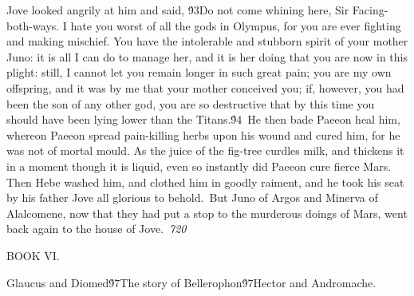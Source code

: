 {Jove looked angrily at him and said, \'93Do not come whining here, Sir Facing-both-ways. I hate you worst of all the gods in Olympus, for you are ever fighting and making mischief. You have the intolerable and stubborn spirit of your mother Juno: it is all I can do to manage her, and it is her doing that you are now in this plight: still, I cannot let you remain longer in such great pain; you are my own offspring, and it was by me that your mother conceived you; if, however, you had been the son of any other god, you are so destructive that by this time you should have been lying lower than the Titans.\'94\
He then bade Paeeon heal him, whereon Paeeon spread pain-killing herbs upon his wound and cured him, for he was not of mortal mould. As the juice of the fig-tree curdles milk, and thickens it in a moment though it is liquid, even so instantly did Paeeon cure fierce Mars. Then Hebe washed him, and clothed him in goodly raiment, and he took his seat by his father Jove all glorious to behold.\
But Juno of Argos and Minerva of Alalcomene, now that they had put a stop to the murderous doings of Mars, went back again to the house of Jove.\
\pard{}\sl720\qc{}

\fs48 \cf2 BOOK VI.\
\pard\pardeftab720\li1710\ri1710\sa64\qj\partightenfactor0

  Glaucus and Diomed\'97The story of Bellerophon\'97Hector and Andromache.\
\pard{}\qj{}

}
